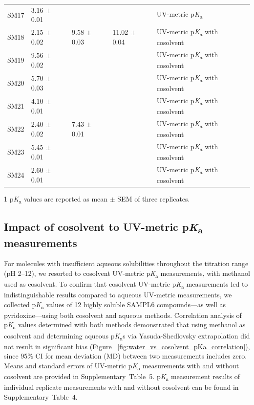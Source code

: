\documentclass[9pt,lineno]{elife}
\newcommand{\pKa}{p\textit{K}\textsubscript{a}}
\begin{document}
\begin{table}[tb!]
\begin{center}
\begin{threeparttable}
\begin{tabular}{@{}lllll@{}}
SM17 & 3.16 $\pm$ 0.01 &  &  & UV-metric \pKa \\
SM18 & 2.15 $\pm$ 0.02 & 9.58 $\pm$ 0.03 & 11.02 $\pm$ 0.04 & UV-metric \pKa{} with cosolvent \\
SM19 & 9.56 $\pm$ 0.02 &  &  & UV-metric \pKa{} with cosolvent \\
SM20 & 5.70 $\pm$ 0.03 &  &  & UV-metric \pKa{} with cosolvent \\
SM21 & 4.10 $\pm$ 0.01 &  &  & UV-metric \pKa{} with cosolvent \\
SM22 & 2.40 $\pm$ 0.02 & 7.43 $\pm$ 0.01 &  & UV-metric \pKa{} with cosolvent \\
SM23 & 5.45 $\pm$ 0.01 &  &  & UV-metric \pKa{} with cosolvent \\
SM24 & 2.60 $\pm$ 0.01 &  &  & UV-metric \pKa{} with cosolvent \\ \bottomrule
\end{tabular}
\begin{tablenotes}
\item[1] \pKa{} values are reported as mean $\pm$ SEM of three replicates.
\end{tablenotes}
\end{threeparttable}
\end{center}
\end{table}

\subsection{Impact of cosolvent to UV-metric \pKa{} measurements}

For molecules with insufficient aqueous solubilities throughout the titration range (pH 2--12), we resorted to cosolvent UV-metric \pKa{} measurements, with methanol used as cosolvent. 
To confirm that cosolvent UV-metric \pKa{} measurements led to indistinguishable results compared to aqueous UV-metric measurements, we collected \pKa{} values of 12 highly soluble SAMPL6 compounds---as well as pyridoxine---using both cosolvent and aqueous methods. 
Correlation analysis of \pKa{} values determined with both methods demonstrated that using methanol as cosolvent and determining aqueous \pKa{}s via Yasuda-Shedlovsky extrapolation did not result in significant bias (Figure ~\ref{fig:water_vs_cosolvent_pKa_correlation}), since 95\% CI for mean deviation (MD) between two measurements includes zero.  
Means and standard errors of UV-metric \pKa{} measurements with and without cosolvent are provided in Supplementary~Table~5. 
\pKa{} measurement results of individual replicate measurements with and without cosolvent can be found in Supplementary~Table~4.
\end{document}
